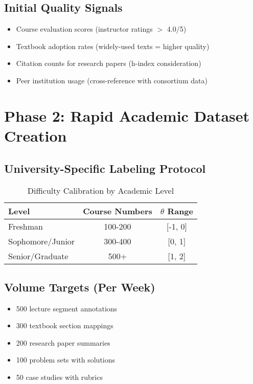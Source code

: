 \documentclass[11pt,a4paper]{report}
\begin{document}
\subsection{Initial Quality Signals}
\begin{itemize}
    \item Course evaluation scores (instructor ratings $>$ 4.0/5)
    \item Textbook adoption rates (widely-used texts = higher quality)
    \item Citation counts for research papers (h-index consideration)
    \item Peer institution usage (cross-reference with consortium data)
\end{itemize}

\section{Phase 2: Rapid Academic Dataset Creation}

\subsection{University-Specific Labeling Protocol}

\begin{table}[H]
\centering
\caption{Difficulty Calibration by Academic Level}
\begin{tabular}{lcc}
\toprule
\textbf{Level} & \textbf{Course Numbers} & \textbf{$\theta$ Range} \\
\midrule
Freshman & 100-200 & [-1, 0] \\
Sophomore/Junior & 300-400 & [0, 1] \\
Senior/Graduate & 500+ & [1, 2] \\
\bottomrule
\end{tabular}
\end{table}

\subsection{Volume Targets (Per Week)}
\begin{itemize}
    \item 500 lecture segment annotations
    \item 300 textbook section mappings
    \item 200 research paper summaries
    \item 100 problem sets with solutions
    \item 50 case studies with rubrics
\end{itemize}
\end{document}

